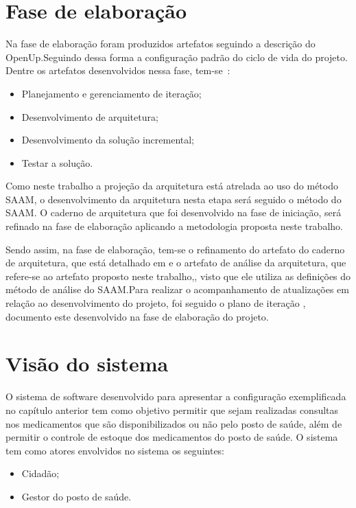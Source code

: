 \section{Fase de elaboração}
Na fase de elaboração foram produzidos artefatos seguindo a descrição do \acrfull{OpenUp}.Seguindo dessa forma a configuração padrão do ciclo de vida do projeto. Dentre os artefatos desenvolvidos nessa fase, tem-se~\cite{openup}:

\begin{itemize}
    \item Planejamento e gerenciamento de iteração;
    \item Desenvolvimento de arquitetura;
    \item Desenvolvimento da solução incremental;
    \item Testar a solução.
\end{itemize}

Como neste trabalho a projeção da arquitetura está atrelada ao uso do método \acrfull{SAAM}, o desenvolvimento da arquitetura nesta etapa será seguido o método do \acrfull{SAAM}. O caderno de arquitetura que foi desenvolvido na fase de iniciação,  será refinado na fase de elaboração aplicando a metodologia proposta neste trabalho.

Sendo assim, na fase de elaboração, tem-se o refinamento do artefato do caderno de arquitetura, que está detalhado em  e o artefato de análise da arquitetura, que refere-se ao artefato proposto neste trabalho,, visto que ele utiliza as definições do método de análise do \acrfull{SAAM}.Para realizar o acompanhamento de atualizações em relação ao desenvolvimento do projeto, foi seguido o plano de iteração , documento este desenvolvido na fase de elaboração do projeto.

\section{Visão do sistema}
O sistema de software desenvolvido para apresentar a configuração exemplificada no capítulo anterior tem como
objetivo permitir que sejam realizadas consultas nos medicamentos que são disponibilizados ou não pelo posto de saúde, além de permitir o controle de estoque dos medicamentos do posto de saúde.
O sistema tem como atores envolvidos no sistema os seguintes:
\begin{itemize}
    \item Cidadão;
    \item Gestor do posto de saúde.
\end{itemize}

